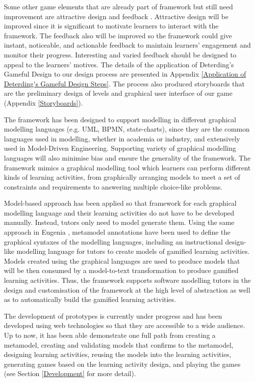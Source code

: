 \documentclass[12pt, a4paper]{report} \usepackage[titletoc]{appendix}
\begin{document}
Some other game elements that are already part of framework but still need improvement are attractive design and feedback \cite{deterding2015lens}. Attractive design will be improved since it is significant to motivate learners to interact with the framework. The feedback also will be improved so the framework could give instant, noticeable, and actionable feedback to maintain learners' engagement and monitor their progress. Interesting and varied feedback should be designed to appeal to the learners' motives. The details of the application of Deterding's Gameful Design to our design process are presented in Appendix \ref{Application of Deterding's Gameful Design Steps}. The process also produced storyboards that are the preliminary design of levels and graphical user interface of our game (Appendix \ref{Storyboards}). 

The framework has been designed to support modelling in different graphical modelling languages (e.g. UML, BPMN, state-charts), since they are the common languages used in modelling, whether in academia or industry, and extensively used in Model-Driven Engineering. Supporting variety of graphical modelling languages will also minimise bias and ensure the generality of the framework. The framework mimics a graphical modelling tool which learners can perform different kinds of learning activities, from graphically arranging models to meet a set of constraints and requirements to answering multiple choice-like problems.

Model-based approach has been applied so that framework for each graphical modelling language and their learning activities do not have to be developed manually. Instead, tutors only need to model generate them. Using the same approach in Eugenia \cite{kolovos2015eugenia}, metamodel annotations have been used to define the graphical syntaxes of the modelling languages, including an instructional design-like modelling language for tutors to create models of gamified learning activities. Models created using the graphical languages are used to produce models that will be then consumed by a model-to-text transformation to produce gamified learning activities. Thus, the framework supports software modelling tutors in the design and customisation of the framework at the high level of abstraction as well as to automatically build the gamified learning activities. 

The development of prototypes is currently under progress and has been developed using web technologies so that they are accessible to a wide audience. Up to now, it has been able demonstrate one full path from creating a metamodel, creating and validating models that confirms to the metamodel, designing learning activities, reusing the models into the learning activities, generating games based on the learning activity design, and playing the games (see Section \ref{Development} for more detail). 
\end{document}
